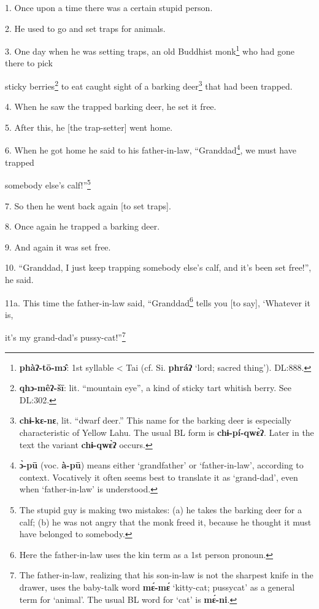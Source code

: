 \setcounter{footnote}{0}

1. Once upon a time there was a certain stupid person.

2. He used to go and set traps for animals.

3. One day when he was setting traps, an old Buddhist monk\footnote{\textbf{phàʔ-tō-mɔ̂}: 1st syllable < Tai (cf. Si. \textbf{phráʔ} `lord; sacred thing'). DL:888.} who had gone there
to pick

sticky berries\footnote{\textbf{qhɔ-mêʔ-šī}: lit. ``mountain eye'', a kind of sticky tart whitish berry. See DL:302.} to eat caught sight of a barking deer\footnote{\textbf{chɨ-kɛ-nɛ}, lit. ``dwarf deer.'' This name for the barking deer is especially characteristic of Yellow Lahu. The usual BL form is \textbf{chɨ-pí-qwɛ̀ʔ}. Later in the text the variant \textbf{chɨ-qwɛ̀ʔ} occurs.} that had been trapped.

4. When he saw the trapped barking deer, he set it free.

5. After this, he [the trap-setter] went home.

6. When he got home he said to his father-in-law, ``Granddad\footnote{\textbf{ɔ̀-pū} (voc. \textbf{à-pū}) means either `grandfather' or `father-in-law', according to context. Vocatively it often seems best to translate it as `grand-dad', even when `father-in-law' is understood.}, we must have
trapped

somebody else's calf!''\footnote{The stupid guy is making two mistakes: (a) he takes the barking deer for a calf; (b) he was not angry that the monk freed it, because he thought it must have belonged to somebody.}

7. So then he went back again [to set traps].

8. Once again he trapped a barking deer.

9. And again it was set free.

10. ``Granddad, I just keep trapping somebody else's calf, and it's been set free!'',
he said.

11a. This time the father-in-law said, ``Granddad\footnote{Here the father-in-law uses the kin term as a 1st person pronoun.} tells you [to say], `Whatever
it is,

it's my grand-dad's pussy-cat!''\footnote{The father-in-law, realizing that his son-in-law is not the sharpest knife in the drawer, uses the baby-talk word \textbf{mɛ́-mɛ́} `kitty-cat; pussycat' as a general term for `animal'. The usual BL word for `cat' is \textbf{mɛ́-ni}.}

